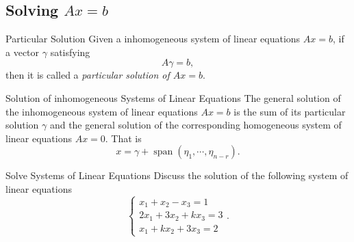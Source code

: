 \subsection{Solving $Ax = b$}

\begin{definition}{Particular Solution}{}
  Given a inhomogeneous system of linear equations $Ax = b$,
  if a vector $\gamma$ satisfying 
  \begin{equation}
    A \gamma = b,
  \end{equation}
  then it is called a \emph{particular solution of $Ax = b$}.
\end{definition}

\begin{proposition}{Solution of inhomogeneous Systems of Linear Equations}{}
  The general solution of the inhomogeneous system of linear equations $Ax = b$
  is the sum of its particular solution $\gamma$ and the general solution of
  the corresponding homogeneous system of linear equations $Ax = 0$.
  That is
  \begin{equation}
    x = \gamma + \operatorname{span} (\eta_1,\cdots,\eta_{n-r}).
  \end{equation}
\end{proposition}

\begin{example}{Solve Systems of Linear Equations}{}
 Discuss the solution of the following system of linear equations 
 \begin{equation}
   \begin{cases}
     x_1 + x_2 - x_3 = 1\\
     2x_1 + 3x_2 + kx_3 = 3\\
     x_1 + kx_2 + 3x_3 = 2
   \end{cases}.
 \end{equation}
\end{example}

